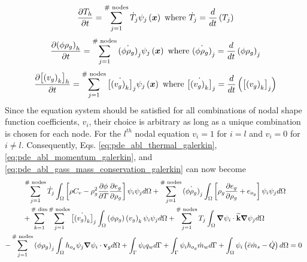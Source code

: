 \begin{equation}
  {\frac{\partial{T_{h}}}{\partial{t}}} = \sum_{j=1}^{\text{\# nodes}} \dot{T}_{j} \psi_{j}\left({\boldsymbol{x}}\right) \text{   where   } \dot{T}_{j} = \frac{d}{dt} \left( T_{j} \right)
\end{equation}
\begin{equation}
  {\frac{\partial{\left( \phi \rho_{g} \right)_{h}}}{\partial{t}}} = \sum_{j=1}^{\text{\# nodes}} \dot{\left( \phi \rho_{g} \right)}_{j} \psi_{j}\left({\boldsymbol{x}}\right) \text{   where   } \dot{\left( \phi \rho_{g} \right)}_{j} = \frac{d}{dt} \left( \phi \rho_{g} \right)_{j}
\end{equation}
\begin{equation}
  {\frac{\partial{\left[\left(v_{g}\right)_{k}\right]_{h}}}{\partial{t}}} = \sum_{j=1}^{\text{\# nodes}} \dot{\left[\left(v_{g}\right)_{k}\right]}_{j} \psi_{j}\left({\boldsymbol{x}}\right) \text{   where   } \dot{\left[\left(v_{g}\right)_{k}\right]}_{j} = \frac{d}{dt} \left(\left[\left(v_{g}\right)_{k}\right]_{j} \right)
\end{equation}
Since the equation system should be satisfied for all combinations of nodal shape function coefficients, $v_{i}$, their choice is arbitrary as long as a unique combination is chosen for each node. For the $l^{th}$ nodal equation $v_{i} = 1$ for $i = l$ and $v_{i} = 0$ for $i \neq l$.  Consequently, Eqs. \ref{eq:pde_abl_thermal_galerkin}, \ref{eq:pde_abl_momentum_galerkin}, and \ref{eq:pde_abl_gass_mass_conservation_galerkin} can now become
\begin{multline}
  \sum_{j=1}^{\text{\# nodes}} \dot{T}_{j} \int_{\Omega} \left[ \rho C_{v} - \rho_{g}^{2} \pdv{\phi}{T}\pdv{e_{g}}{\rho_{g}} \right]\psi_{i} \psi_{j} d \Omega + \sum_{j=1}^{\text{\# nodes}} \dot{\left( \phi \rho_{g} \right)}_{j} \int_{\Omega} \left[ \rho_{g} \pdv{e_{g}}{\rho_{g}} + e_{o_{g}}\right] \psi_{i} \psi_{j} d \Omega
  \\ + \sum_{k=1}^{\text{\# dim}} \sum_{j=1}^{\text{\# nodes}} \dot{\left[\left(v_{g}\right)_{k}\right]}_{j} \int_{\Omega} \left( \phi \rho_{g} \right) \left(v_{g}\right)_{k} \psi_{i} \psi_{j}  d \Omega
  + \sum_{j=1}^{\text{\# nodes}} T_{j} \int_{\Omega} \grad{\psi_{i}} \cdot \widetilde{\textbf{k}} \grad{\psi_{j}} d \Omega \hspace{3eM}
  \\ - \sum_{j=1}^{\text{\# nodes}} \left( \phi \rho_{g} \right)_{j} \int_{\Omega} h_{o_{g}} \psi_{j} \grad{\psi_{i}} \cdot \mathbf{v}_{g} d \Omega
  + \int_{\Gamma} \psi_{i} q_{w} d \Gamma + \int_{\Gamma} \psi_{i} h_{o_{g}} \dot{m}_{w} d \Gamma + \int_{\Omega} \psi_{i} \left(\bar{e} \dot{m}_{s} - \dot{Q} \right) d \Omega  = 0 \hspace{0.5eM}
\end{multline}
